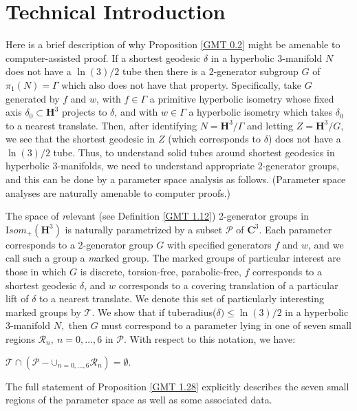 \chapter{Technical Introduction}\label{Ch.TechIntro} %
Here is a brief description of why Proposition \ref{GMT 0.2} might be amenable to 
computer-assisted proof.
If a shortest geodesic $\delta$ in a hyperbolic $3$-manifold $N$ does not have 
a $\ln(3)/2$
tube then there is a 2-generator subgroup $G$ of $\pi_1(N) = \Gamma$
which also does not have that property.
Specifically, take $G$ generated by $f$ and $w$,
with $f \in \Gamma$ a primitive hyperbolic isometry
whose fixed axis $\delta_0 \subset {\mathbf H}^3$ projects to $\delta$, and 
with $w \in \Gamma$ a hyperbolic isometry
which takes $\delta_0$ to a nearest translate.
Then, after identifying $N={\mathbf H}^3/\Gamma$ and letting 
$Z={\mathbf H}^3/G$,
we see that the shortest geodesic in $Z$ (which corresponds to $\delta$)
does not have 
a $\ln(3)/2$ tube. 
Thus, to understand solid tubes around shortest geodesics in hyperbolic 
$3$-manifolds, we need to understand appropriate 2-generator groups, and this 
can be done by a parameter space analysis as follows.  (Parameter space 
analyses are naturally amenable to 
computer proofs.)

The space of {\textit relevant}
(see
Definition \ref{GMT 1.12})
2-generator groups 
in ${\mathrm Isom}_+({\mathbf H}^3)$ is naturally
parametrized by a subset ${\mathcal P}$ of ${\mathbf C}^3.$  
Each parameter corresponds to a
2-generator group $G$ with specified generators $f$ and $w$, and we call 
such a group a {\textit marked group}. 
The marked groups of particular interest are those in which $G$ is
discrete, torsion-free, parabolic-free, $f$ corresponds to a shortest
geodesic $\delta$, and $w$ corresponds to a
covering translation of a particular lift of
$\delta$ to a nearest translate.  
We denote this set of particularly interesting marked groups by ${\mathcal T}.$
We show that if tuberadius($\delta) \le \ln(3)/2$ 
in a hyperbolic $3$-manifold $N,$ then 
$G$ must correspond to a parameter lying in one of seven small regions
${\mathcal R}_n,\ n=0,\ldots,6$ 
in ${\mathcal P}$.  
With respect to this notation, we have:

\begin{proposition} \label{GMT 1.28}
${\mathcal T} \cap ({\mathcal P} - \mathbf{\cup}_{n=0,\ldots,6}{\mathcal R}_n) = \emptyset.$
\vfill\end{proposition}

The full statement of Proposition \ref{GMT 1.28}
explicitly describes the seven small
regions of the parameter space as well as some associated data.

